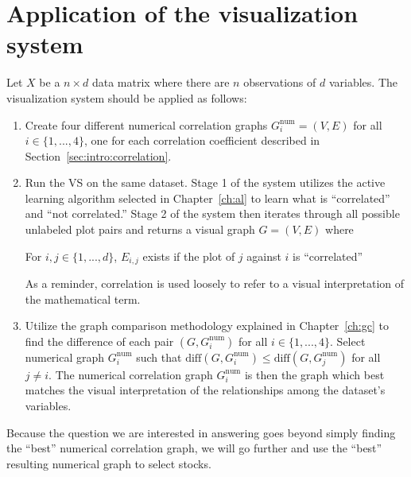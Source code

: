 \section{Application of the visualization system}
\label{sec:usage:newanalysis}

Let $X$ be a $n\times d$ data matrix where there are $n$ observations of $d$ 
variables. The visualization system should be applied as follows:

\tablespacing
\begin{enumerate}
	\item Create four different numerical correlation graphs 
	$G_i^{\text{num}}=(V,E)$ for all $i\in \{1,...,4\}$, one for each 
	correlation coefficient described in Section~\ref{sec:intro:correlation}.
	
	\item Run the VS on the same dataset. Stage 1 of the system utilizes the 
	active learning algorithm selected in Chapter~\ref{ch:al} to learn what is 
	``correlated'' and ``not correlated.'' Stage 2 of the system then iterates 
	through all possible unlabeled plot pairs and returns a visual graph 
	$G=(V,E)$ where 

\begin{algorithm}
	For $i,j\in \{1,...,d\}$, $E_{i,j}$ exists if the plot of $j$ against $i$ 
	is ``correlated''
\end{algorithm}

	As a reminder, correlation is used loosely to refer to a visual 
	interpretation of the mathematical term.

	\item Utilize the graph comparison methodology explained in 
	Chapter~\ref{ch:gc} to find the difference of each pair 
	$(G,G_i^{\text{num}})$ for all $i \in \{1,...,4\}$. Select numerical 
	graph $G_i^{\text{num}}$ such that $\text{diff}(G,G_i^{\text{num}}) 
	\leq \text{diff}(G,G_j^{\text{num}})$ for all $j\neq i$. The 
	numerical correlation graph $G_i^{\text{num}}$ is then the graph which 
	best matches the visual interpretation of the relationships among the 
	dataset's variables.
\end{enumerate}
\bodyspacing

Because the question we are interested in answering goes beyond simply finding 
the ``best'' numerical correlation graph, we will go further and use the 
``best'' resulting numerical graph to select stocks.